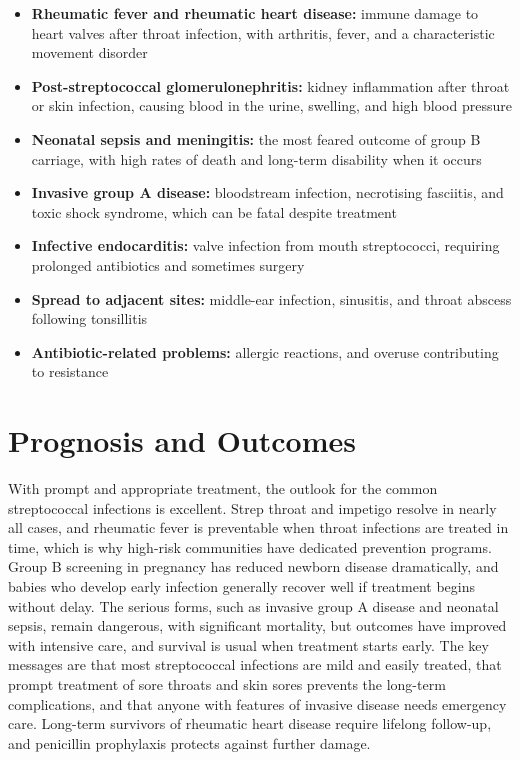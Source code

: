 \begin{itemize}
    \item \textbf{Rheumatic fever and rheumatic heart disease:} immune damage to heart valves after throat infection, with arthritis, fever, and a characteristic movement disorder
    \item \textbf{Post-streptococcal glomerulonephritis:} kidney inflammation after throat or skin infection, causing blood in the urine, swelling, and high blood pressure
    \item \textbf{Neonatal sepsis and meningitis:} the most feared outcome of group B carriage, with high rates of death and long-term disability when it occurs
    \item \textbf{Invasive group A disease:} bloodstream infection, necrotising fasciitis, and toxic shock syndrome, which can be fatal despite treatment
    \item \textbf{Infective endocarditis:} valve infection from mouth streptococci, requiring prolonged antibiotics and sometimes surgery
    \item \textbf{Spread to adjacent sites:} middle-ear infection, sinusitis, and throat abscess following tonsillitis
    \item \textbf{Antibiotic-related problems:} allergic reactions, and overuse contributing to resistance
\end{itemize}

\section*{Prognosis and Outcomes}
With prompt and appropriate treatment, the outlook for the common streptococcal infections is excellent. Strep throat and impetigo resolve in nearly all cases, and rheumatic fever is preventable when throat infections are treated in time, which is why high-risk communities have dedicated prevention programs. Group B screening in pregnancy has reduced newborn disease dramatically, and babies who develop early infection generally recover well if treatment begins without delay. The serious forms, such as invasive group A disease and neonatal sepsis, remain dangerous, with significant mortality, but outcomes have improved with intensive care, and survival is usual when treatment starts early. The key messages are that most streptococcal infections are mild and easily treated, that prompt treatment of sore throats and skin sores prevents the long-term complications, and that anyone with features of invasive disease needs emergency care. Long-term survivors of rheumatic heart disease require lifelong follow-up, and penicillin prophylaxis protects against further damage.

